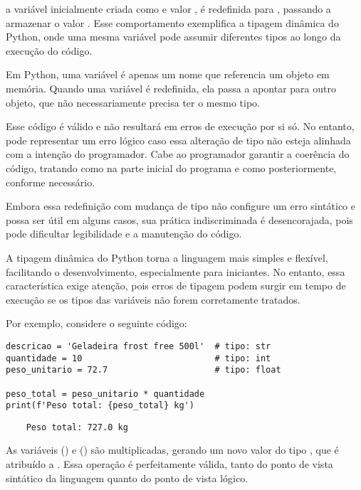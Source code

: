 a variável  inicialmente criada como  e valor , é redefinida para
, passando a armazenar o valor .
Esse comportamento exemplifica a tipagem dinâmica do Python, onde uma mesma variável pode assumir diferentes tipos ao
longo da execução do código.

Em Python, uma variável é apenas um nome que referencia um objeto em memória.
Quando uma variável é redefinida, ela passa a apontar para outro objeto, que não necessariamente precisa ter o mesmo tipo.

Esse código é válido e não resultará em erros de execução por si só.
No entanto, pode representar um erro lógico caso essa alteração de tipo não esteja alinhada com a intenção do programador.
Cabe ao programador garantir a coerência do
código, tratando  como  na parte inicial do programa e como
 posteriormente, conforme necessário.

Embora essa redefinição com mudança de tipo não configure um erro sintático e possa ser útil em alguns casos, sua
prática indiscriminada é desencorajada, pois pode dificultar legibilidade e a manutenção do código.

A tipagem dinâmica do Python torna a linguagem mais simples e flexível, facilitando o desenvolvimento, especialmente
para iniciantes.
No entanto, essa característica exige atenção, pois erros de tipagem podem surgir em tempo de execução se os tipos
das variáveis não forem corretamente tratados.


Por exemplo, considere o seguinte código:
\begin{verbatim}
descricao = 'Geladeira frost free 500l'  # tipo: str
quantidade = 10                          # tipo: int
peso_unitario = 72.7                     # tipo: float

peso_total = peso_unitario * quantidade
print(f'Peso total: {peso_total} kg')
\end{verbatim}
%
\begin{verbatim}
    Peso total: 727.0 kg
\end{verbatim}

As variáveis  () e  () são multiplicadas, gerando
um novo valor do tipo , que é atribuído a .
Essa operação é perfeitamente válida, tanto do ponto de vista sintático da linguagem quanto do ponto de vista lógico.

